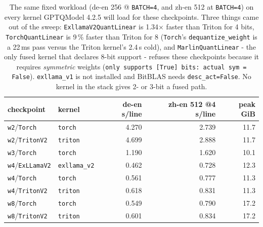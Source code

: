 \begin{table}[t]
\centering
\small
\setlength{\tabcolsep}{5pt}
\begin{tabular}{llrrr}
\toprule
checkpoint & kernel & de-en s/line & zh-en 512 @4 s/line & peak GiB \\
\midrule
\texttt{w2}/\texttt{Torch} & \texttt{torch} & 4.270 & 2.739 & 11.7 \\
\texttt{w2}/\texttt{TritonV2} & \texttt{triton} & 4.699 & 2.888 & 11.7 \\
\texttt{w3}/\texttt{Torch} & \texttt{torch} & 1.190 & 1.620 & 10.1 \\
\texttt{w4}/\texttt{ExLLamaV2} & \texttt{exllama\_v2} & 0.462 & 0.728 & 12.3 \\
\texttt{w4}/\texttt{Torch} & \texttt{torch} & 0.561 & 0.777 & 11.3 \\
\texttt{w4}/\texttt{TritonV2} & \texttt{triton} & 0.618 & 0.831 & 11.3 \\
\texttt{w8}/\texttt{Torch} & \texttt{torch} & 0.549 & 0.790 & 17.2 \\
\texttt{w8}/\texttt{TritonV2} & \texttt{triton} & 0.601 & 0.834 & 17.2 \\
\bottomrule
\end{tabular}
\caption{The same fixed workload (de-en 256 @ \texttt{BATCH=4}, and zh-en 512 at \texttt{BATCH=4}) on every kernel GPTQModel 4.2.5 will load for these checkpoints. Three things came out of the sweep: \texttt{ExllamaV2QuantLinear} is 1.34$\times$ faster than Triton for 4 bits, \texttt{TorchQuantLinear} is 9\,\% faster than Triton for 8 (\texttt{Torch}'s \texttt{dequantize\_weight} is a 22\,ms pass versus the Triton kernel's 2.4\,s cold), and \texttt{MarlinQuantLinear} - the only fused kernel that declares 8-bit support - refuses these checkpoints because it requires \emph{symmetric} weights (\texttt{only supports [True] bits: actual sym = False}). \texttt{exllama\_v1} is not installed and BitBLAS needs \texttt{desc\_act=False}. No kernel in the stack gives 2- or 3-bit a fused path.}
\label{tab:backends}
\end{table}
